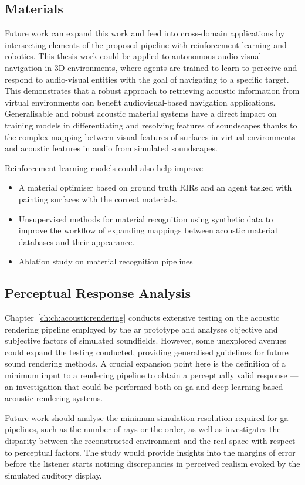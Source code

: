 \subsection{Materials}
Future work can expand this work and feed into cross-domain applications by intersecting elements of the proposed pipeline with reinforcement learning and robotics. This thesis work could be applied to autonomous audio-visual navigation in 3D environments, where agents are trained to learn to perceive and respond to audio-visual entities with the goal of navigating to a specific target. This demonstrates that a robust approach to retrieving acoustic information from virtual environments can benefit audiovisual-based navigation applications. Generalisable and robust acoustic material systems have a direct impact on training models in differentiating and resolving features of soundscapes thanks to the complex mapping between visual features of surfaces in virtual environments and acoustic features in audio from simulated soundscapes.\par
Reinforcement learning models could also help improve 


\begin{itemize}
    \item A material optimiser based on ground truth RIRs and an agent tasked with painting surfaces with the correct materials.
    \item Unsupervised methods for material recognition using synthetic data to improve the workflow of expanding mappings between acoustic material databases and their appearance.
    \item Ablation study on material recognition pipelines
\end{itemize}

\subsection{Perceptual Response Analysis}
Chapter~\ref{ch:ch:acousticrendering} conducts extensive testing on the acoustic rendering pipeline employed by the \acrshort{ar} prototype and analyses objective and subjective factors of simulated soundfields. However, some unexplored avenues could expand the testing conducted, providing generalised guidelines for future sound rendering methods. A crucial expansion point here is the definition of a minimum input to a rendering pipeline to obtain a perceptually valid response --- an investigation that could be performed both on \acrshort{ga} and deep learning-based acoustic rendering systems.\par
Future work should analyse the minimum simulation resolution required for \acrshort{ga} pipelines, such as the number of rays or the order, as well as investigates the disparity between the reconstructed environment and the real space with respect to perceptual factors. The study would provide insights into the margins of error before the listener starts noticing discrepancies in perceived realism evoked by the simulated auditory display.

